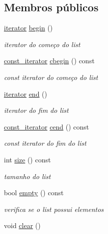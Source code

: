 \subsection*{Membros públicos}
\begin{DoxyCompactItemize}
\item 
\hyperlink{classsc_1_1list_1_1iterator}{iterator} \hyperlink{classsc_1_1list_a2fa015e137583d7142933500b34f1e29}{begin} ()
\begin{DoxyCompactList}\small\item\em iterator do começo do list \end{DoxyCompactList}\item 
\hyperlink{classsc_1_1list_1_1const__iterator}{const\+\_\+iterator} \hyperlink{classsc_1_1list_a8141d9041c0b76a71d6ff8103f31c517}{cbegin} () const 
\begin{DoxyCompactList}\small\item\em const iterator do começo do list \end{DoxyCompactList}\item 
\hyperlink{classsc_1_1list_1_1iterator}{iterator} \hyperlink{classsc_1_1list_a48429f0cf3d990fa6dfd5140e6aa95a7}{end} ()
\begin{DoxyCompactList}\small\item\em iterator do fim do list \end{DoxyCompactList}\item 
\hyperlink{classsc_1_1list_1_1const__iterator}{const\+\_\+iterator} \hyperlink{classsc_1_1list_aec5075e0ac046fe4e28cb2bb286c96ec}{cend} () const 
\begin{DoxyCompactList}\small\item\em const iterator do fim do list \end{DoxyCompactList}\item 
int \hyperlink{classsc_1_1list_aee0e60e25f8a119956ab55cf126a8cf2}{size} () const 
\begin{DoxyCompactList}\small\item\em tamanho do list \end{DoxyCompactList}\item 
bool \hyperlink{classsc_1_1list_a1a75c788813cbdccd99af6058ed9f35f}{empty} () const 
\begin{DoxyCompactList}\small\item\em verifica se o list possui elementos \end{DoxyCompactList}\item 
void \hyperlink{classsc_1_1list_aece86319a40d15b88fd1a981ba1a226e}{clear} ()\hypertarget{classsc_1_1list_aece86319a40d15b88fd1a981ba1a226e}{}\label{classsc_1_1list_aece86319a40d15b88fd1a981ba1a226e}


\end{DoxyCompactItemize}
